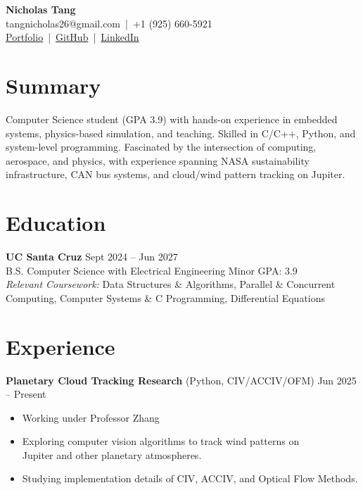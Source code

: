 \documentclass[letterpaper,10pt]{article}
\begin{document}

\begin{center}
    {\LARGE \textbf{Nicholas Tang}} \\ [0.5em]
    tangnicholas26@gmail.com \,|\, +1 (925) 660-5921 \\ [0.3em]
    \href{https://nicholas-tangerine.github.io}{Portfolio} \,|\, 
    \href{https://github.com/nicholas-tangerine}{GitHub} \,|\, 
    \href{https://linkedin.com/in/nicholas-tangerine}{LinkedIn}
\end{center}

\section*{Summary}
Computer Science student (GPA 3.9) with hands-on experience in embedded
systems, physics-based simulation, and teaching. Skilled in C/C++, Python, and
system-level programming. Fascinated by the intersection of computing,
aerospace, and physics, with experience spanning NASA sustainability
infrastructure, CAN bus systems, and cloud/wind pattern tracking on Jupiter.

\section*{Education}
\textbf{UC Santa Cruz} \hfill Sept 2024 -- Jun 2027 \\
B.S. Computer Science with Electrical Engineering Minor \hfill GPA: 3.9 \\
\textit{Relevant Coursework:} Data Structures \& Algorithms, Parallel \& Concurrent \\ 
Computing, Computer Systems \& C Programming, Differential Equations

\section*{Experience}
\textbf{Planetary Cloud Tracking Research} (Python, CIV/ACCIV/OFM) \hfill Jun 2025 -- Present
\begin{itemize}
    \item Working under Professor Zhang
    \item Exploring computer vision algorithms to track wind patterns on \\
        Jupiter and other planetary atmospheres.
    \item Studying implementation details of CIV, ACCIV, and Optical Flow
        Methods.
\end{itemize}
\end{document}
